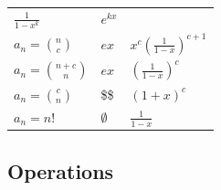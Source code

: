 \begin{longtable}[]{@{}lll@{}}
\begin{minipage}[t]{0.30\columnwidth}
\(\frac 1 {1-x^k}\)\strut
\end{minipage} & \begin{minipage}[t]{0.30\columnwidth}\raggedright
\(e^{kx}\)\strut
\end{minipage}\tabularnewline
\begin{minipage}[t]{0.30\columnwidth}\raggedright
\(a_n = {n \choose c}\)\strut
\end{minipage} & \begin{minipage}[t]{0.30\columnwidth}\raggedright
\(ex\)\strut
\end{minipage} & \begin{minipage}[t]{0.30\columnwidth}\raggedright
\(x^c \left(\frac{1}{1-x}\right)^{c+1}\)\strut
\end{minipage}\tabularnewline
\begin{minipage}[t]{0.30\columnwidth}\raggedright
\(a_n = {n+c \choose n}\)\strut
\end{minipage} & \begin{minipage}[t]{0.30\columnwidth}\raggedright
\(ex\)\strut
\end{minipage} & \begin{minipage}[t]{0.30\columnwidth}\raggedright
\(\left( \frac 1 {1-x} \right)^c\)\strut
\end{minipage}\tabularnewline
\begin{minipage}[t]{0.30\columnwidth}\raggedright
\(a_n = {c \choose n}\)\strut
\end{minipage} & \begin{minipage}[t]{0.30\columnwidth}\raggedright
\$\$\strut
\end{minipage} & \begin{minipage}[t]{0.30\columnwidth}\raggedright
\((1+x)^c\)\strut
\end{minipage}\tabularnewline
\begin{minipage}[t]{0.30\columnwidth}\raggedright
\(a_n = n!\)\strut
\end{minipage} & \begin{minipage}[t]{0.30\columnwidth}\raggedright
\(\emptyset\)\strut
\end{minipage} & \begin{minipage}[t]{0.30\columnwidth}\raggedright
\(\frac{1}{1-x}\)\strut
\end{minipage}\tabularnewline
\bottomrule
\end{longtable}

\hypertarget{operations}{%
\subsection{Operations}\label{operations}}

